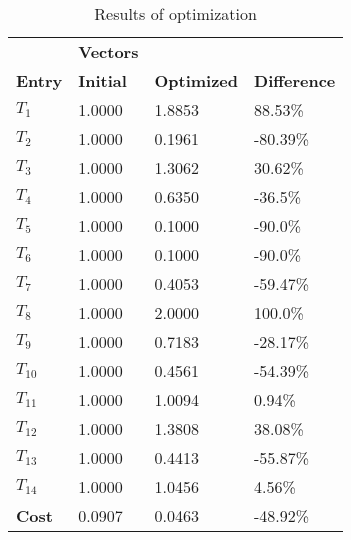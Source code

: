 \begin{table}[H]
\centering
\begin{tabular}{llll}
\textbf{}      & \cellcolor[HTML]{EFEFEF}\textbf{Vectors} & \textbf{} & \textbf{}         \\
\rowcolor[HTML]{EFEFEF} 
\textbf{Entry} & \textbf{Initial} & \textbf{Optimized} & \textbf{Difference} \\
$T_1$ & 1.0000 & 1.8853 & 88.53\% \\ 
$T_2$ & 1.0000 & 0.1961 & -80.39\% \\ 
$T_3$ & 1.0000 & 1.3062 & 30.62\% \\ 
$T_4$ & 1.0000 & 0.6350 & -36.5\% \\ 
$T_5$ & 1.0000 & 0.1000 & -90.0\% \\ 
$T_6$ & 1.0000 & 0.1000 & -90.0\% \\ 
$T_7$ & 1.0000 & 0.4053 & -59.47\% \\ 
$T_8$ & 1.0000 & 2.0000 & 100.0\% \\ 
$T_9$ & 1.0000 & 0.7183 & -28.17\% \\ 
$T_10$ & 1.0000 & 0.4561 & -54.39\% \\ 
$T_11$ & 1.0000 & 1.0094 & 0.94\% \\ 
$T_12$ & 1.0000 & 1.3808 & 38.08\% \\ 
$T_13$ & 1.0000 & 0.4413 & -55.87\% \\ 
$T_14$ & 1.0000 & 1.0456 & 4.56\% \\ 
\rowcolor[HTML]{EFEFEF} 
\textbf{Cost}  & 0.0907 & 0.0463 & -48.92\% \\ 
\end{tabular}
\caption{Results of optimization}
\label{tab:OptimizationAnalysis}
\end{table}